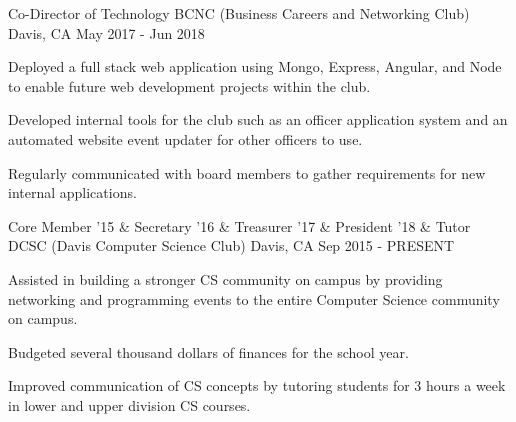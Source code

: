 

\begin{cventries}


  \cventry
  {Co-Director of Technology} %
  {BCNC (Business Careers and Networking Club)} %
  {Davis, CA} %
  {May 2017 - Jun 2018} %
  {
    \begin{cvitems} %
      \item {Deployed a full stack web application using Mongo, Express, Angular, and Node to enable future web development projects within the club.}
      \item {Developed internal tools for the club such as an officer application system and an automated website event updater for other officers to use.}
      \item {Regularly communicated with board members to gather requirements for new internal applications.}
    \end{cvitems}
  }
  \cventry
    {Core Member '15
    \& Secretary '16
    \& Treasurer '17
    \& President '18
    \& Tutor} %
    {DCSC (Davis Computer Science Club)} %
    {Davis, CA} %
    {Sep 2015 - PRESENT} %
    {
      \begin{cvitems} %
        \item {Assisted in building a stronger CS community on campus by providing networking and programming events to the entire Computer Science community on campus.}
        \item {Budgeted several thousand dollars of finances for the school year.}
        \item {Improved communication of CS concepts by tutoring students for 3 hours a week in lower and upper division CS courses.}
      \end{cvitems}
    }

\end{cventries}
